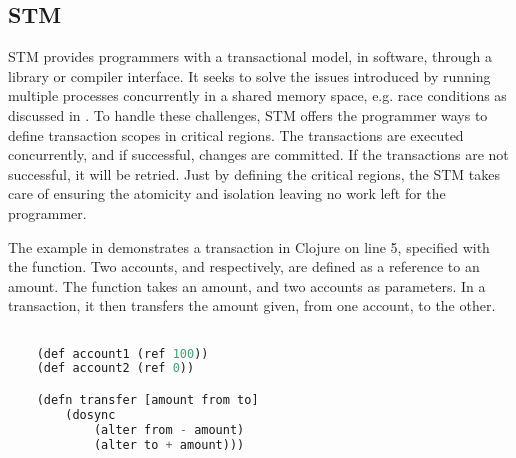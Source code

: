 \subsection{\acl{STM}}\label{sec:stm_stm}
\ac{STM} provides programmers with a transactional model, in software, through a library or compiler interface\cite{herlihy2011tm}. It seeks to solve the issues introduced by running multiple processes concurrently in a shared memory space, e.g. race conditions as discussed in . To handle these challenges, \ac{STM} offers the programmer ways to define transaction scopes in critical regions. The transactions are executed concurrently, and if successful, changes are committed. If the transactions are not successful, it will be retried. Just by defining the critical regions, the \ac{STM} takes care of ensuring the atomicity and isolation leaving no work left for the programmer. 

The example in  demonstrates a transaction in Clojure on line 5, specified with the  function. Two accounts,  and  respectively, are defined as a reference to an amount. The function  takes an amount, and two accounts as parameters. In a transaction, it then transfers the amount given, from one account, to the other.

\begin{lstlisting}[label=lst:stmexample,
  caption={STM in Clojure},
  language=Lisp,  
  showspaces=false,
  showtabs=false,
  breaklines=true,
  showstringspaces=false,
  breakatwhitespace=true,
  commentstyle=\color{greencomments},
  keywordstyle=\color{bluekeywords},
  stringstyle=\color{redstrings}]  % Start your code-block

	(def account1 (ref 100))
	(def account2 (ref 0))

	(defn transfer [amount from to]
    	(dosync
    		(alter from - amount)
    		(alter to + amount)))
       
\end{lstlisting}

